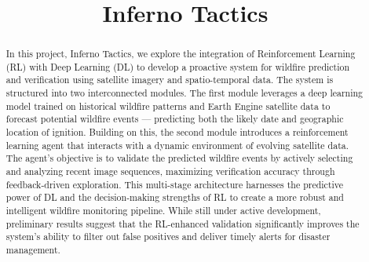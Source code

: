\documentclass[conference]{IEEEtran}
\begin{document}
\title{Inferno Tactics\\
}

\author{
\and
{}
}

\maketitle

\begin{abstract}
In this project, Inferno Tactics, we explore the integration of Reinforcement Learning (RL) with Deep Learning (DL) to develop a proactive system for wildfire prediction and verification using satellite imagery and spatio-temporal data. The system is structured into two interconnected modules. The first module leverages a deep learning model trained on historical wildfire patterns and Earth Engine satellite data to forecast potential wildfire events — predicting both the likely date and geographic location of ignition. Building on this, the second module introduces a reinforcement learning agent that interacts with a dynamic environment of evolving satellite data. The agent's objective is to validate the predicted wildfire events by actively selecting and analyzing recent image sequences, maximizing verification accuracy through feedback-driven exploration. This multi-stage architecture harnesses the predictive power of DL and the decision-making strengths of RL to create a more robust and intelligent wildfire monitoring pipeline. While still under active development, preliminary results suggest that the RL-enhanced validation significantly improves the system's ability to filter out false positives and deliver timely alerts for disaster management.
\end{abstract}
\end{document}
